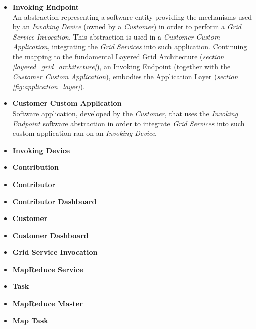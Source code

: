 \begin{itemize}
\begin{itemize}
    \end{itemize}
    \item \textbf{Invoking Endpoint}\label{invoking_endpoint}\\
    An abstraction representing a software entity providing the mechanisms used by an \textit{Invoking Device} (owned by a \textit{Customer}) in order to perform a \textit{Grid Service Invocation}. This abstraction is used in a \textit{Customer Custom Application}, integrating the \textit{Grid Services} into such application. Continuing the mapping to the fundamental Layered Grid Architecture (\textit{section \ref{layered_grid_architecture}}), an Invoking Endpoint (together with the \textit{Customer Custom Application}), embodies the Application Layer (\textit{section \ref{fig:application_layer}}).
    \item \textbf{Customer Custom Application}\label{customer_custom_application}\\
    Software application, developed by the \textit{Customer}, that uses the \textit{Invoking Endpoint} software abstraction in order to integrate \textit{Grid Services} into such custom application ran on an \textit{Invoking Device}.
    \item \textbf{Invoking Device}\label{invoking_device}\\
    \item \textbf{Contribution}\label{contribution}\\
    \item \textbf{Contributor}\label{contributor}\\
    \item \textbf{Contributor Dashboard}\label{contributor_dashboard}\\
    \item \textbf{Customer}\label{customer}\\
    \item \textbf{Customer Dashboard}\label{customer_dashboard}\\
    \item \textbf{Grid Service Invocation}\label{grid_service_invocation}\\
    \item \textbf{MapReduce Service}\label{mapreduce_service}\\
    \item \textbf{Task}\label{task}\\
    \item \textbf{MapReduce Master}\label{mapreduce_master}\\
    \item \textbf{Map Task}\label{map_task}\\

\end{itemize}
